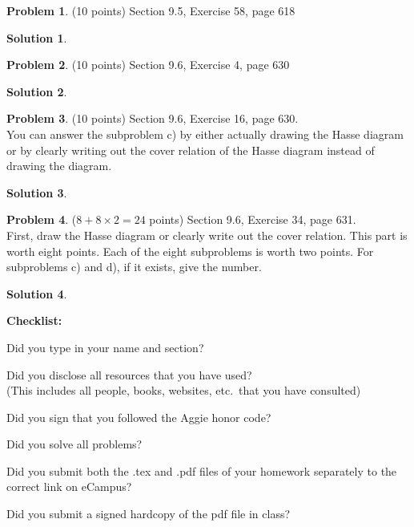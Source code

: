 \documentclass{article}
\theoremstyle{definition}
\newtheorem{problem}{Problem}
\newtheorem*{solution}{Solution}
\newcommand{\checklist}{\noindent\textbf{Checklist:}
\begin{compactitem}[$\Box$] 
\item Did you type in your name and section? 
\item Did you disclose all resources that you have used? \\
(This includes all people, books, websites, etc.\ that you have consulted)
\item Did you sign that you followed the Aggie honor code? 
\item Did you solve all problems? 
\item Did you submit both the .tex and .pdf files of your homework separately 
to the correct link on eCampus?
\item Did you submit a signed hardcopy of the pdf file in class? 
\end{compactitem}
}
\begin{document}
\begin{problem} (10 points)
Section 9.5, Exercise 58, page 618
\end{problem}
\begin{solution} 
\end{solution}

\begin{problem} (10 points)
Section 9.6, Exercise 4, page 630
\end{problem}
\begin{solution} 
\end{solution}

\begin{problem} (10 points)
Section 9.6, Exercise 16, page 630.
\ \\
You can answer the subproblem c) by either actually drawing the Hasse diagram 
or by clearly writing out the cover relation of the Hasse diagram instead of 
drawing the diagram.
\end{problem}
\begin{solution} 
\end{solution}

\begin{problem} ($8+8\times 2 = 24$ points)
Section 9.6, Exercise 34, page 631.
\ \\ 
First, draw the Hasse diagram or clearly write out the cover relation.  This
part is worth eight points.  Each of the eight subproblems is worth two points.
For subproblems c) and d), if it exists, give the number.
\end{problem}
\begin{solution} 
\end{solution}

\goodbreak
\checklist
\end{document}
